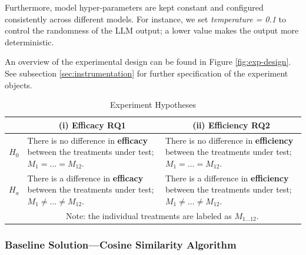 Furthermore, model hyper-parameters are kept constant and configured consistently across different models. For instance, we set \textit{temperature = 0.1} to control the randomness of the LLM output; a lower value makes the output more deterministic.


An overview of the experimental design can be found in Figure \ref{fig:exp-design}. See subsection \ref{sec:instrumentation} for further specification of the experiment objects.


\newcommand{\equalM}{$M_{1} = \dots = M_{12}$}
\newcommand{\notEqualM}{$M_{1} \neq \dots \neq M_{12}$}

\begin{table}[h]
    \centering
    \caption{Experiment Hypotheses}
    \renewcommand{\arraystretch}{1.65} %
    \begin{tabular}{@{} c p{3.5cm} p{3.5cm} @{}}
    \toprule
    &\multicolumn{1}{c}{\textbf{(i) Efficacy RQ1}}
    &\multicolumn{1}{c}{\textbf{(ii) Efficiency RQ2}} \\
    \midrule
    $H_{0}$ %
    & There is no difference in \textbf{efficacy} between the treatments
    under test; \equalM.
    & There is no difference in \textbf{efficiency} between the treatments
    under test; \equalM.\\
    $H_{a}$ %
    & There is a difference in \textbf{efficacy} between the treatments
    under test; \notEqualM.
    & There is a difference in \textbf{efficiency} between the treatments
    under test; \notEqualM.\\
    \bottomrule
    &\multicolumn{2}{c}{Note: the individual treatments are labeled as $M_{1\dots12}$.} \\
    \end{tabular}
    \label{tab:hypothesis}
\end{table}

\subsubsection{Baseline Solution---Cosine Similarity Algorithm}

